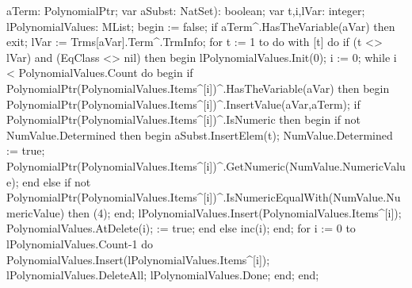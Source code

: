                             aTerm: PolynomialPtr;
                            var aSubst: NatSet): boolean;
var
   t,i,lVar: integer;
   lPolynomialValues: MList;
begin
    := false;
   if aTerm^.HasTheVariable(aVar) then exit;
   lVar := Trms[aVar].Term^.TrmInfo;
   for t := 1 to  do
      with [t] do
         if (t <> lVar) and (EqClass <> nil) then
         begin
            lPolynomialValues.Init(0);
            i := 0;
            while i < PolynomialValues.Count do
            begin
               if PolynomialPtr(PolynomialValues.Items^[i])^.HasTheVariable(aVar) then
               begin
                  PolynomialPtr(PolynomialValues.Items^[i])^.InsertValue(aVar,aTerm);
                  if PolynomialPtr(PolynomialValues.Items^[i])^.IsNumeric then
                  begin
                     if not NumValue.Determined then
                     begin
                        aSubst.InsertElem(t);
                        NumValue.Determined := true;
                        PolynomialPtr(PolynomialValues.Items^[i])^.GetNumeric(NumValue.NumericValue);
                     end
                     else if not PolynomialPtr(PolynomialValues.Items^[i])^.IsNumericEqualWith(NumValue.NumericValue) then
                        (4);
                  end;
                  lPolynomialValues.Insert(PolynomialValues.Items^[i]);
                  PolynomialValues.AtDelete(i);
                   := true;
               end else inc(i);
            end;
            for i := 0 to lPolynomialValues.Count-1 do
               PolynomialValues.Insert(lPolynomialValues.Items^[i]);
            lPolynomialValues.DeleteAll;
            lPolynomialValues.Done;
         end;
end;
\eatline
{}\nwendcode{}\nwdocspar
